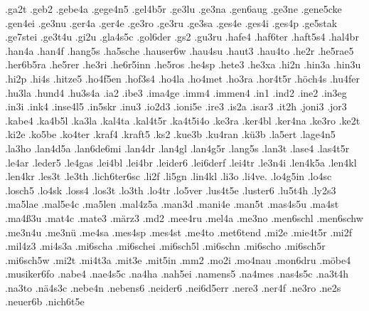{    .ga2t
    .geb2
    .gebe4a
    .gege4n5
    .gel4b5r
    .ge3lu
    .ge3na
    .gen6aug
    .ge3ne
    .gene5cke
    .gen4ei
    .ge3nu
    .ger4a
    .ger4e
    .ge3ro
    .ge3ru
    .ge3sa
    .ges4e
    .ges4i
    .ges4p
    .ge5stak
    .ge7stei
    .ge3t4u
    .gi2u
    .gla4s5c
    .gol6der
    .gs2
    .gu3ru
    .hafe4
    .haf6ter
    .haft5s4
    .hal4br
    .han4a
    .han4f
    .hang5s
    .ha5sche
    .hauser6w
    .hau4su
    .haut3
    .hau4to
    .he2r
    .he5rae5
    .her6b5ra
    .he5rer
    .he3ri
    .he6r5inn
    .he5ros
    .he4sp
    .hete3
    .he3xa
    .hi2n
    .hin3a
    .hin3u
    .hi2p
    .hi4s
    .hitze5
    .ho4f5en
    .hof3s4
    .ho4la
    .ho4met
    .ho3ra
    .hor4t5r
    .höch4s
    .hu4fer
    .hu3la
    .hund4
    .hu3s4a
    .ia2
    .ibe3
    .ima4ge
    .imm4
    .immen4
    .in1
    .ind2
    .ine2
    .in3eg
    .in3i
    .ink4
    .inse4l5
    .in5skr
    .inu3
    .io2d3
    .ioni5e
    .ire3
    .is2a
    .isar3
    .it2h
    .joni3
    .jor3
    .kabe4
    .ka4b5l
    .ka3la
    .kal4ta
    .kal4t5r
    .ka4t5i4o
    .ke3ra
    .ker4bl
    .ker4na
    .ke3ro
    .ke2t
    .ki2e
    .ko5be
    .ko4ter
    .kraf4
    .kraft5
    .ks2
    .kue3b
    .ku4ran
    .kü3b
    .la5ert
    .lage4n5
    .la3ho
    .lan4d5a
    .lan6de6mi
    .lan4dr
    .lan4gl
    .lan4g5r
    .lang5s
    .lan3t
    .lase4
    .las4t5r
    .le4ar
    .leder5
    .le4gas
    .lei4bl
    .lei4br
    .leider6
    .lei6derf
    .lei4tr
    .le3n4i
    .len4k5a
    .len4kl
    .len4kr
    .les3t
    .le3th
    .lich6ter6sc
    .li2f
    .li5gn
    .lin4kl
    .li3o
    .li4ve.
    .lo4g5in
    .lo4sc
    .losch5
    .lo4sk
    .loss4
    .los3t
    .lo3th
    .lo4tr
    .lo5ver
    .lus4t5e
    .luster6
    .lu5t4h
    .ly2s3
    .ma5lae
    .mal5e4c
    .ma5len
    .mal4z5a
    .man3d
    .mani4e
    .man5t
    .mas4s5u
    .ma4st
    .ma4ß3u
    .mat4c
    .mate3
    .märz3
    .md2
    .mee4ru
    .mel4a
    .me3no
    .men6schl
    .men6schw
    .me3n4u
    .me3nü
    .me4sa
    .mes4sp
    .mes4st
    .me4to
    .met6tend
    .mi2e
    .mie4t5r
    .mi2f
    .mil4z3
    .mi4s3a
    .mi6scha
    .mi6schei
    .mi6sch5l
    .mi6schn
    .mi6scho
    .mi6sch5r
    .mi6sch5w
    .mi2t
    .mi4t3a
    .mit3e
    .mit5in
    .mm2
    .mo2i
    .mo4nau
    .mon6dru
    .möbe4
    .musiker6fo
    .nabe4
    .nae4s5c
    .na4ha
    .nah5ei
    .namens5
    .na4mes
    .nas4s5c
    .na3t4h
    .na3to
    .nä4s3c
    .nebe4n
    .nebens6
    .neider6
    .nei6d5err
    .nere3
    .ner4f
    .ne3ro
    .ne2s
    .neuer6b
    .nich6t5e
}
